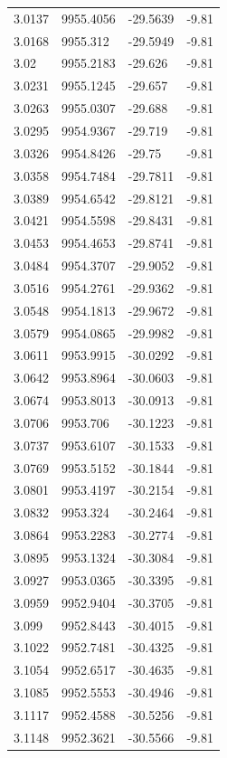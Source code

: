 \begin{table}[H]
\begin{tabular}{llll}
3.0137 & 9955.4056 & -29.5639 & -9.81 \\
3.0168 & 9955.312 & -29.5949 & -9.81 \\
3.02 & 9955.2183 & -29.626 & -9.81 \\
3.0231 & 9955.1245 & -29.657 & -9.81 \\
3.0263 & 9955.0307 & -29.688 & -9.81 \\
3.0295 & 9954.9367 & -29.719 & -9.81 \\
3.0326 & 9954.8426 & -29.75 & -9.81 \\
3.0358 & 9954.7484 & -29.7811 & -9.81 \\
3.0389 & 9954.6542 & -29.8121 & -9.81 \\
3.0421 & 9954.5598 & -29.8431 & -9.81 \\
3.0453 & 9954.4653 & -29.8741 & -9.81 \\
3.0484 & 9954.3707 & -29.9052 & -9.81 \\
3.0516 & 9954.2761 & -29.9362 & -9.81 \\
3.0548 & 9954.1813 & -29.9672 & -9.81 \\
3.0579 & 9954.0865 & -29.9982 & -9.81 \\
3.0611 & 9953.9915 & -30.0292 & -9.81 \\
3.0642 & 9953.8964 & -30.0603 & -9.81 \\
3.0674 & 9953.8013 & -30.0913 & -9.81 \\
3.0706 & 9953.706 & -30.1223 & -9.81 \\
3.0737 & 9953.6107 & -30.1533 & -9.81 \\
3.0769 & 9953.5152 & -30.1844 & -9.81 \\
3.0801 & 9953.4197 & -30.2154 & -9.81 \\
3.0832 & 9953.324 & -30.2464 & -9.81 \\
3.0864 & 9953.2283 & -30.2774 & -9.81 \\
3.0895 & 9953.1324 & -30.3084 & -9.81 \\
3.0927 & 9953.0365 & -30.3395 & -9.81 \\
3.0959 & 9952.9404 & -30.3705 & -9.81 \\
3.099 & 9952.8443 & -30.4015 & -9.81 \\
3.1022 & 9952.7481 & -30.4325 & -9.81 \\
3.1054 & 9952.6517 & -30.4635 & -9.81 \\
3.1085 & 9952.5553 & -30.4946 & -9.81 \\
3.1117 & 9952.4588 & -30.5256 & -9.81 \\
3.1148 & 9952.3621 & -30.5566 & -9.81 \\

\end{tabular}
\end{table}
